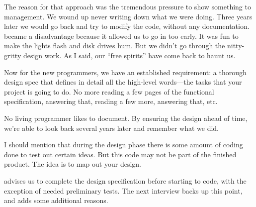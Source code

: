 \begin{interview}
\begin{tfquot}
The reason for that approach was the tremendous pressure to show
something to management. We wound up never writing down what we were
doing. Three years later we would go back and try to modify the code,
without any documentation. \Forth{} became a disadvantage because it
allowed us to go in too early. It was fun to make the lights flash and
disk drives hum. But we didn't go through the nitty-gritty design
work. As I said, our ``free spirits'' have come back to haunt us.

Now for the new programmers, we have an established requirement: a
thorough design spec that defines in detail all the high-level \Forth{}
words---the tasks that your project is going to do. No more reading a
few pages of the functional specification, answering that, reading a
few more, answering that, etc.

No living programmer likes to document. By ensuring the design ahead
of time, we're able to look back several years later and remember what
we did.

I should mention that during the design phase there is some amount of
coding done to test out certain ideas. But this code may not be part
of the finished product. The idea is to map out your design.
\end{tfquot}%
\end{interview}
 advises us to complete the design specification
before starting to code, with the exception of needed preliminary
tests. The next interview backs up this point, and adds some
additional reasons.%

